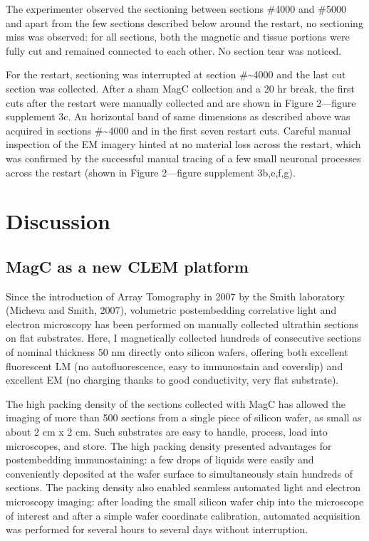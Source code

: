 \documentclass{article}
\begin{document}
The experimenter observed the sectioning between sections \#4000 and \#5000 and apart from the few sections described below around the restart, no sectioning miss was observed: for all sections, both the magnetic and tissue portions were fully cut and remained connected to each other. No section tear was noticed.

For the restart, sectioning was interrupted at section \#\textasciitilde4000 and the last cut section was collected. After a sham MagC collection and a 20 hr break, the first cuts after the restart were manually collected and are shown in Figure 2---figure supplement 3c. An horizontal band of same dimensions as described above was acquired in sections \#\textasciitilde4000 and in the first seven restart cuts. Careful manual inspection of the EM imagery hinted at no material loss across the restart, which was confirmed by the successful manual tracing of a few small neuronal processes across the restart (shown in Figure 2---figure supplement 3b,e,f,g).

\section*{Discussion}

\subsection*{MagC as a new CLEM platform}

Since the introduction of Array Tomography in 2007 by the Smith laboratory (Micheva and Smith, 2007), volumetric postembedding correlative light and electron microscopy has been performed on manually collected ultrathin sections on flat substrates. Here, I magnetically collected hundreds of consecutive sections of nominal thickness 50 nm directly onto silicon wafers, offering both excellent fluorescent LM (no autofluorescence, easy to immunostain and coverslip) and excellent EM (no charging thanks to good conductivity, very flat substrate).

The high packing density of the sections collected with MagC has allowed the imaging of more than 500 sections from a single piece of silicon wafer, as small as about 2 cm x 2 cm. Such substrates are easy to handle, process, load into microscopes, and store. The high packing density presented advantages for postembedding immunostaining: a few drops of liquids were easily and conveniently deposited at the wafer surface to simultaneously stain hundreds of sections. The packing density also enabled seamless automated light and electron microscopy imaging: after loading the small silicon wafer chip into the microscope of interest and after a simple wafer coordinate calibration, automated acquisition was performed for several hours to several days without interruption.
\end{document}
